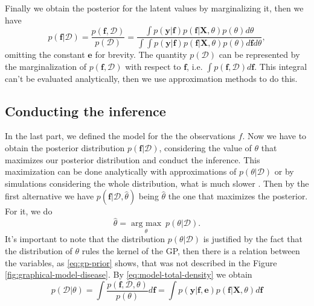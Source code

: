 %
Finally we obtain the posterior for the latent values by marginalizing it, then we have
%
\begin{equation}
    p(\mathbf{f}|\mathcal{D})=
    \frac{p(\mathbf{f},\mathcal{D})}{p(\mathcal{D})}=
    \frac{\int p(\mathbf{y}|\mathbf{f})p(\mathbf{f}|\mathbf{X},\theta)p(\theta) d\theta}{\int \int p(\mathbf{y}|\mathbf{f})p(\mathbf{f}|\mathbf{X},\theta)p(\theta) d\mathbf{f} d\theta},
 \label{eq:model-posterior-density}
\end{equation}
%
omitting the constant $\mathbf{e}$ for brevity. The quantity $p(\mathcal{D})$ can be represented by the marginalization of $p(\mathbf{f},\mathcal{D})$ with respect to $\mathbf{f}$, i.e. $\int p(\mathbf{f},\mathcal{D}) d\mathbf{f}$. This integral can't be evaluated analytically, then we use approximation methods to do this.
%

\subsection{Conducting the inference}

In the last part, we defined the model for the the observations $f$. Now we have to obtain the posterior distribution $p(\mathbf{f}|\mathcal{D})$, considering the value of $\theta$ that maximizes our posterior distribution and conduct the inference. This maximization can be done analytically with approximations of $p(\theta|\mathcal{D})$ or by simulations considering the whole distribution, what is much slower \cite{Vanhatalo2010Vehtari}. Then by the first alternative we have $p(\mathbf{f}|\mathcal{D},\hat{\theta})$ being $\hat{\theta}$ the one that maximizes the posterior. For it, we do
%
\begin{equation}
\hat{\theta} = \underset{\theta}{\operatorname{arg \ max}} \ p(\theta|\mathcal{D}).
\end{equation}
%
It's important to note that the distribution $p(\theta|\mathcal{D})$ is justified by the fact that the distribution of $\theta$ rules the kernel of the GP, then there is a relation between the variables, as  \eqref{eq:gp-prior} shows, that was not described in the Figure \ref{fig:graphical-model-disease}. By \eqref{eq:model-total-density} we obtain
%
\begin{equation}
p(\mathcal{D}|\theta)=\int \frac{p(\mathbf{f},\mathcal{D},\theta)}{p(\theta)}d\mathbf{f}= \int p(\mathbf{y}|\mathbf{f},\mathbf{e})p(\mathbf{f}|\mathbf{X},\theta) d\mathbf{f}
\end{equation}
%
